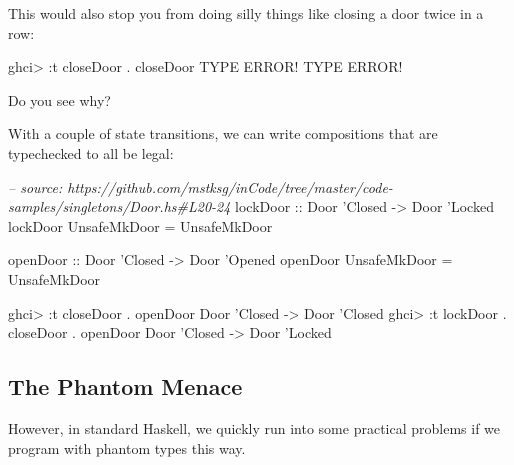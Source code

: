 \documentclass[]{article}
\newenvironment{Shaded}{}{}
\newcommand{\DataTypeTok}[1]{\textcolor[rgb]{0.56,0.13,0.00}{#1}}
\newcommand{\CharTok}[1]{\textcolor[rgb]{0.25,0.44,0.63}{#1}}
\newcommand{\CommentTok}[1]{\textcolor[rgb]{0.38,0.63,0.69}{\textit{#1}}}
\newcommand{\OtherTok}[1]{\textcolor[rgb]{0.00,0.44,0.13}{#1}}
\newcommand{\FunctionTok}[1]{\textcolor[rgb]{0.02,0.16,0.49}{#1}}
\newcommand{\NormalTok}[1]{#1}
\begin{document}
This would also stop you from doing silly things like closing a door twice in a
row:

\begin{Shaded}
\begin{Highlighting}[]
\NormalTok{ghci}\FunctionTok{>} \FunctionTok{:}\NormalTok{t closeDoor }\FunctionTok{.}\NormalTok{ closeDoor}
\DataTypeTok{TYPE} \DataTypeTok{ERROR}\FunctionTok{!}  \DataTypeTok{TYPE} \DataTypeTok{ERROR}\FunctionTok{!}
\end{Highlighting}
\end{Shaded}

Do you see why?

With a couple of state transitions, we can write compositions that are
typechecked to all be legal:

\begin{Shaded}
\begin{Highlighting}[]
\CommentTok{-- source: https://github.com/mstksg/inCode/tree/master/code-samples/singletons/Door.hs#L20-24}
\OtherTok{lockDoor ::} \DataTypeTok{Door} \CharTok{'Closed -> Door '}\DataTypeTok{Locked}
\NormalTok{lockDoor }\DataTypeTok{UnsafeMkDoor} \FunctionTok{=} \DataTypeTok{UnsafeMkDoor}

\OtherTok{openDoor ::} \DataTypeTok{Door} \CharTok{'Closed -> Door '}\DataTypeTok{Opened}
\NormalTok{openDoor }\DataTypeTok{UnsafeMkDoor} \FunctionTok{=} \DataTypeTok{UnsafeMkDoor}
\end{Highlighting}
\end{Shaded}

\begin{Shaded}
\begin{Highlighting}[]
\NormalTok{ghci}\FunctionTok{>} \FunctionTok{:}\NormalTok{t closeDoor }\FunctionTok{.}\NormalTok{ openDoor}
\DataTypeTok{Door} \CharTok{'Closed -> Door '}\DataTypeTok{Closed}
\NormalTok{ghci}\FunctionTok{>} \FunctionTok{:}\NormalTok{t lockDoor }\FunctionTok{.}\NormalTok{ closeDoor }\FunctionTok{.}\NormalTok{ openDoor}
\DataTypeTok{Door} \CharTok{'Closed -> Door '}\DataTypeTok{Locked}
\end{Highlighting}
\end{Shaded}

\subsection{The Phantom Menace}\label{the-phantom-menace}

However, in standard Haskell, we quickly run into some practical problems if we
program with phantom types this way.
\end{document}

